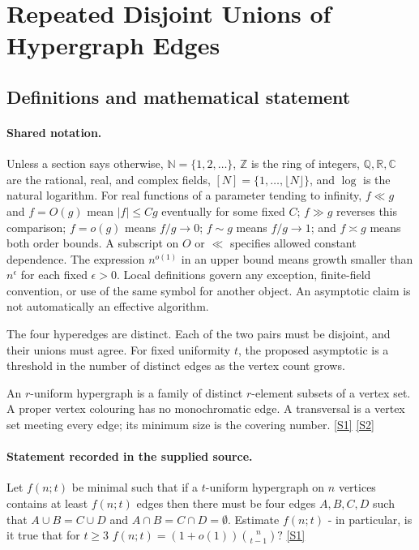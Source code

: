 \documentclass[11pt,a4paper]{article}
\newcommand{\N}{\mathbb{N}}
\newcommand{\Z}{\mathbb{Z}}
\newcommand{\Q}{\mathbb{Q}}
\newcommand{\R}{\mathbb{R}}
\newcommand{\C}{\mathbb{C}}
\newcommand{\sref}[2]{\hyperlink{source:#1:#2}{[S#2]}}
\begin{document}
\section{Repeated Disjoint Unions of Hypergraph Edges}\label{statement}


\subsection{Definitions and mathematical statement}

\paragraph{Shared notation.}Unless a section says otherwise, $\N=\{1,2,\ldots\}$,
$\Z$ is the ring of integers, $\Q,\R,\C$ are the rational, real, and complex
fields, $[N]=\{1,\ldots,\lfloor N\rfloor\}$, and $\log$ is the natural
logarithm. For real functions of a parameter tending to infinity,
$f\ll g$ and $f=O(g)$ mean $|f|\leq Cg$ eventually for some fixed $C$;
$f\gg g$ reverses this comparison; $f=o(g)$ means $f/g\to0$;
$f\sim g$ means $f/g\to1$; and $f\asymp g$ means both order bounds.
A subscript on $O$ or $\ll$ specifies allowed constant dependence.
The expression $n^{o(1)}$ in an upper bound means growth smaller than
$n^\epsilon$ for each fixed $\epsilon>0$. Local definitions govern any
exception, finite-field convention, or use of the same symbol for another
object. An asymptotic claim is not automatically an effective algorithm.



The four hyperedges are distinct. Each of the two pairs must be disjoint, and their unions must agree. For fixed uniformity $t$, the proposed asymptotic is a threshold in the number of distinct edges as the vertex count grows.

An $r$-uniform hypergraph is a family of distinct $r$-element subsets of a vertex set. A proper vertex colouring has no monochromatic edge. A transversal is a vertex set meeting every edge; its minimum size is the covering number. \sref{statement}{1} \sref{statement}{2}

\paragraph{Statement recorded in the supplied source.}
Let $f(n;t)$ be minimal such that if a $t$-uniform hypergraph on $n$ vertices contains at least $f(n;t)$ edges then there must be four edges $A,B,C,D$ such that $ A\cup B= C\cup D $ and $ A\cap B=C\cap D=\emptyset. $ Estimate $f(n;t)$ - in particular, is it true that for $t\geq 3$ $ f(n;t)=(1+o(1))\binom{n}{t-1}? $ \sref{statement}{1}
\end{document}
